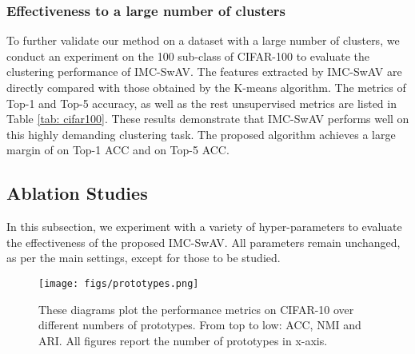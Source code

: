 \documentclass[journal]{IEEEtran}
\begin{document}
\subsubsection{Effectiveness to a large number of clusters} 
To further validate our method on a dataset with a large number of clusters, we conduct an experiment on the 100 sub-class of CIFAR-100 to  evaluate the clustering performance of IMC-SwAV. The features extracted by IMC-SwAV are directly compared with those obtained by the K-means algorithm. The metrics of Top-1 and Top-5 accuracy, as well as the rest unsupervised metrics are listed in Table \ref{tab: cifar100}. 
These results demonstrate that IMC-SwAV performs well on this highly demanding clustering task. The proposed algorithm achieves a large margin of  on Top-1 ACC and  on Top-5 ACC. 




\subsection{Ablation Studies}

In this subsection, we experiment with a variety of hyper-parameters to evaluate the effectiveness of the proposed IMC-SwAV. All parameters remain unchanged, as per the main settings, except for those to be studied. \par



\begin{figure}[t]
    \centering
    \texttt{[image: figs/prototypes.png]}
    \caption{These diagrams plot the performance metrics on CIFAR-10 over different numbers of prototypes. From top to low: ACC, NMI and ARI. All figures report the number of prototypes in x-axis.
    }
   \label{fig:prototypes illustration}
\end{figure} 
\end{document}

